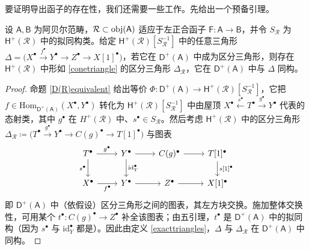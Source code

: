 要证明导出函子的存在性，我们还需要一些工作。先给出一个预备引理。

\begin{Lem}\label{preplemma}
	设 $\mathsf{A}, \mathsf{B}$ 为阿贝尔范畴，$\mathcal{R}\subset\textup{obj}(\mathsf{A})$ 适应于左正合函子 $\mathsf{F}:\mathsf{A}\rightarrow\mathsf{B}$，并令 $S_\mathcal{R}$ 为 $\mathsf{H^+}(\mathcal{R})$ 中的拟同构类。给定 $\mathsf{H^+(\mathcal{R})}[S_\mathcal{R}^{-1}]$ 中的任意三角形 $\Delta=\big(X^\bullet\xrightarrow{f^\bullet}Y^\bullet\rightarrow Z^\bullet\rightarrow X[1]^\bullet\big)$，若它在 $\mathsf{D^+(A)}$ 中成为区分三角形，则存在 $\mathsf{H^+(\mathcal{R})}$ 中形如 \eqref{conetriangle} 的区分三角形 $\Delta_\mathcal{R}$，它在 $\mathsf{D^+(A)}$ 中与 $\Delta$ 同构。
\end{Lem}

\begin{proof}
	命题 \ref{D(R)equivalent} 给出等价 $\Phi:\mathsf{D^+(A)}\rightarrow\mathsf{H^+(\mathcal{R})}[S_\mathcal{R}^{-1}]$，它把 $f\in\text{Hom}_\mathsf{D^+(A)}(X^\bullet,Y^\bullet)$ 转化为 $\mathsf{H^+(\mathcal{R})}[S_\mathcal{R}^{-1}]$ 中由屋顶 $X^\bullet\xleftarrow{s^\bullet}T^\bullet\xrightarrow{g^\bullet} Y^\bullet$ 代表的态射类，其中 $g^\bullet$ 在 $H^+(\mathcal{R})$ 中、$s^\bullet\in S_\mathcal{R}$。然后考虑 $\mathsf{H^+(\mathcal{R})}$ 中的区分三角形 $\Delta_\mathcal{R}\coloneqq\big(T^\bullet\xrightarrow{g^\bullet} Y^\bullet\rightarrow C(g)^\bullet\rightarrow T[1]^\bullet\big)$ 与图表
	\[
	\begin{tikzcd}
		T^\bullet\arrow[r, "g^\bullet"]\arrow[d, "s^\bullet"'] & Y^\bullet \arrow[r]\arrow[d, "\text{id}_Y^\bullet"] & C(g)^\bullet\arrow[r] & T[1]^\bullet\arrow[d, "{s[1]^\bullet}"] \\
		X^\bullet\arrow[r, "f^\bullet"'] & Y^\bullet\arrow[r] & Z^\bullet\arrow[r] & X[1]^\bullet
	\end{tikzcd}
	\]
	即 $\mathsf{D^+(A)}$ 中（依假设）区分三角形之间的图表，其左方块交换。施加整体交换性，可用某个 $t^\bullet:C(g)^\bullet\rightarrow Z^\bullet$ 补全该图表；由五引理，$t^\bullet$ 是 $\mathsf{D^+(A)}$ 中的拟同构（因为 $s^\bullet$ 与 $\text{id}_Y^\bullet$ 都是）。因此由定义 \ref{exacttriangles}，$\Delta$ 与 $\Delta_\mathcal{R}$ 在 $\mathsf{D^+(A)}$ 中同构。
\end{proof}


